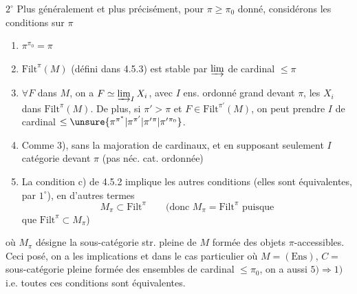 \textcircled{$2^\circ$} Plus généralement et plus précisément,  pour $\pi\geq\pi_0$ donné,  considérons les conditions sur $\pi$
\begin{enumerate}[label=\arabic*)]
\item $\pi^{\pi_0}=\pi$
\item $\mathrm{Filt}^{\pi}(M)$ (défini dans 4.5.3) est stable par $\varinjlim$ de cardinal $\leq\pi$
\item $\forall F$ dans $M$, on a $F\simeq\varinjlim_I X_i$, avec $I$ ens. ordonné grand devant $\pi$, les $X_i$ dans $\mathrm{Filt}^{\pi}(M)$. De plus, si $\pi'>\pi$ et $F\in\mathrm{Filt}^{\pi'}(M)$, on peut prendre $I$ de cardinal $\leq\unsure{\pi^{\pi^*}|\pi^{\pi'}|\pi'{}^{\pi}|\pi'{}^{\pi_0}}$.
\item Comme 3), sans la majoration de cardinaux, et  en supposant seulement $I$ catégorie  devant $\pi$ (pas néc. cat. ordonnée)
\item La condition c) de 4.5.2 implique les autres conditions (elles sont équivalentes, par $1^\circ$), en d'autres termes
\[
M_\pi\subset\mathrm{Filt}^{\pi}\qquad(\text{donc }M_\pi=\mathrm{Filt}^{\pi}\text{ puisque}
\]
 que $\mathrm{Filt}^{\pi}\subset M_\pi$)
\end{enumerate}

où $M_\pi$ désigne la sous-catégorie str. pleine de $M$ formée des objets $\pi$-accessibles.
Ceci posé, on a les implications
et dans le cas particulier où $M=(\mathrm{Ens})$, $C=$ sous-catégorie pleine formée des ensembles de cardinal $\leq\pi_0$, on a aussi $5)\Rightarrow1)$ i.e. toutes ces conditions sont équivalentes.

